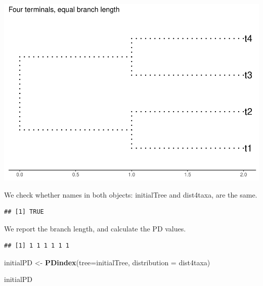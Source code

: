 \documentclass[]{article}
\newenvironment{Shaded}{\begin{snugshade}}{\end{snugshade}}
\newcommand{\DataTypeTok}[1]{\textcolor[rgb]{0.13,0.29,0.53}{#1}}
\newcommand{\KeywordTok}[1]{\textcolor[rgb]{0.13,0.29,0.53}{\textbf{#1}}}
\newcommand{\NormalTok}[1]{#1}
\newcommand{\OperatorTok}[1]{\textcolor[rgb]{0.81,0.36,0.00}{\textbf{#1}}}
\newcommand{\StringTok}[1]{\textcolor[rgb]{0.31,0.60,0.02}{#1}}
\begin{document}
\includegraphics{workedExample_files/figure-latex/unnamed-chunk-2-1.pdf}

We check whether names in both objects: initialTree and dist4taxa, are
the same.

\begin{Shaded}
\end{Shaded}

\begin{verbatim}
## [1] TRUE
\end{verbatim}

We report the branch length, and calculate the PD values.

\begin{Shaded}
\end{Shaded}

\begin{verbatim}
## [1] 1 1 1 1 1 1
\end{verbatim}

\begin{Shaded}
\begin{Highlighting}[]
\NormalTok{initialPD <-}\StringTok{ }\KeywordTok{PDindex}\NormalTok{(}\DataTypeTok{tree=}\NormalTok{initialTree, }\DataTypeTok{distribution =}\NormalTok{ dist4taxa)}

\NormalTok{initialPD}
\end{Highlighting}
\end{Shaded}
\end{document}
